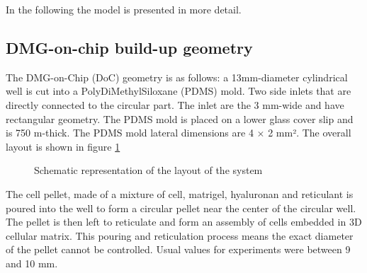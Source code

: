 \documentclass[11pt,a4paper]{article}
\begin{document}
In the following the model is presented in more detail.

\subsection{DMG-on-chip build-up geometry}
The DMG-on-Chip (DoC) geometry is as follows: a 13mm-diameter cylindrical well is cut into a PolyDiMethylSiloxane (PDMS) mold. Two side inlets that are directly connected to the circular part. The inlet are the 3 mm-wide and have rectangular geometry. The PDMS mold is placed on a lower glass cover slip and is 750 \textmu m-thick. The PDMS mold lateral dimensions are 4 $\times$ 2 mm². The overall layout is shown in figure \ref{drawing}

\begin{figure}[ht]
\begin{center}
\caption{Schematic representation of the layout of the system\label{drawing}}
\end{center}
\end{figure}

The cell pellet, made of a mixture of cell, matrigel, hyaluronan and reticulant is poured into the well to form a circular pellet near the center of the circular well. The pellet is then left to reticulate and form an assembly of cells embedded in 3D cellular matrix. This pouring and reticulation process means the exact diameter of the pellet cannot be controlled. Usual values for experiments were between 9 and 10 mm.
\end{document}
